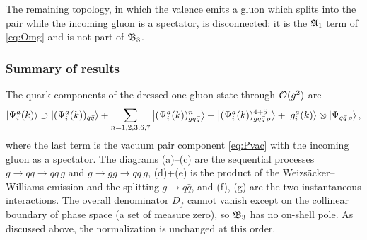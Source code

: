 The remaining topology, in which the valence emits a gluon which splits into the pair while the
incoming gluon is a spectator, is disconnected: it is the $\mathfrak{A}_{1}$ term of \eqref{eq:Omg} and is
not part of $\mathfrak{B}_{3}$.

\subsubsection{Summary of results}
\label{sec:sum-g}

The quark components of the dressed one gluon state through $\mathcal{O}(g^{2})$ are
\begin{equation}
\left|\Psi^{a}_{i}(k)\right\rangle\supset\left|(\Psi^{a}_{i}(k))_{q\bar q}\right\rangle
+\sum_{n=1,2,3,6,7}\left|(\Psi^{a}_{i}(k))^{n}_{gq\bar q}\right\rangle
+\left|(\Psi^{a}_{i}(k))^{4+5}_{gq\bar q\,\rho}\right\rangle
+\left|g^{a}_{i}(k)\right\rangle\otimes\left|\Psi_{q\bar q\,\rho}\right\rangle ,
\label{eq:sum-g}
\end{equation}
where the last term is the vacuum pair component \eqref{eq:Pvac} with the incoming gluon as a
spectator. The diagrams (a)--(c) are the sequential processes $g\to q\bar q\to q\bar q\,g$ and
$g\to gg\to q\bar q\,g$, (d)+(e) is the product of the Weizs\"acker--Williams emission and the
splitting $g\to q\bar q$, and (f), (g) are the two instantaneous interactions. The overall
denominator $D_{f}$ cannot vanish except on the collinear boundary of phase space (a set of
measure zero), so $\mathfrak{B}_{3}$ has no on-shell pole. As discussed above, the normalization is
unchanged at this order.
